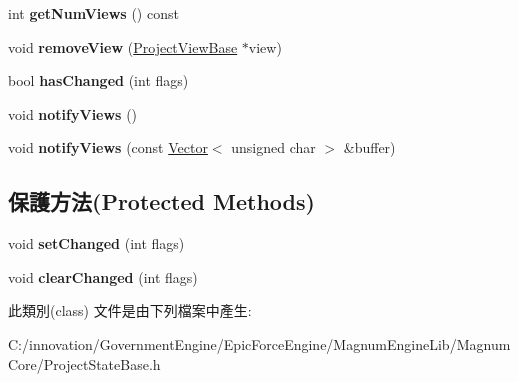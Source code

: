 \begin{DoxyCompactItemize}
\item 
int {\bfseries get\+Num\+Views} () const \hypertarget{class_i_dream_sky_1_1_project_model_base_abd951db9512656d3ab020d89de06c5ff}{}\label{class_i_dream_sky_1_1_project_model_base_abd951db9512656d3ab020d89de06c5ff}

\item 
void {\bfseries remove\+View} (\hyperlink{class_i_dream_sky_1_1_project_view_base}{Project\+View\+Base} $\ast$view)\hypertarget{class_i_dream_sky_1_1_project_model_base_a162e6f4df4c0d989951393405eb25519}{}\label{class_i_dream_sky_1_1_project_model_base_a162e6f4df4c0d989951393405eb25519}

\item 
bool {\bfseries has\+Changed} (int flags)\hypertarget{class_i_dream_sky_1_1_project_model_base_a5900d22e6f887ff0b020b60efc2cec69}{}\label{class_i_dream_sky_1_1_project_model_base_a5900d22e6f887ff0b020b60efc2cec69}

\item 
void {\bfseries notify\+Views} ()\hypertarget{class_i_dream_sky_1_1_project_model_base_a44faf6aa1d8deef1555f28b48f4e2c73}{}\label{class_i_dream_sky_1_1_project_model_base_a44faf6aa1d8deef1555f28b48f4e2c73}

\item 
void {\bfseries notify\+Views} (const \hyperlink{class_i_dream_sky_1_1_vector}{Vector}$<$ unsigned char $>$ \&buffer)\hypertarget{class_i_dream_sky_1_1_project_model_base_af177b7bd6207b862af896896226ae52e}{}\label{class_i_dream_sky_1_1_project_model_base_af177b7bd6207b862af896896226ae52e}

\end{DoxyCompactItemize}
\subsection*{保護方法(Protected Methods)}
\begin{DoxyCompactItemize}
\item 
void {\bfseries set\+Changed} (int flags)\hypertarget{class_i_dream_sky_1_1_project_model_base_a512e4a96489b64359efb90a2827d0d06}{}\label{class_i_dream_sky_1_1_project_model_base_a512e4a96489b64359efb90a2827d0d06}

\item 
void {\bfseries clear\+Changed} (int flags)\hypertarget{class_i_dream_sky_1_1_project_model_base_af0162141b8f0190a32d0707afe4e558c}{}\label{class_i_dream_sky_1_1_project_model_base_af0162141b8f0190a32d0707afe4e558c}

\end{DoxyCompactItemize}


此類別(class) 文件是由下列檔案中產生\+:\begin{DoxyCompactItemize}
\item 
C\+:/innovation/\+Government\+Engine/\+Epic\+Force\+Engine/\+Magnum\+Engine\+Lib/\+Magnum\+Core/Project\+State\+Base.\+h\end{DoxyCompactItemize}
